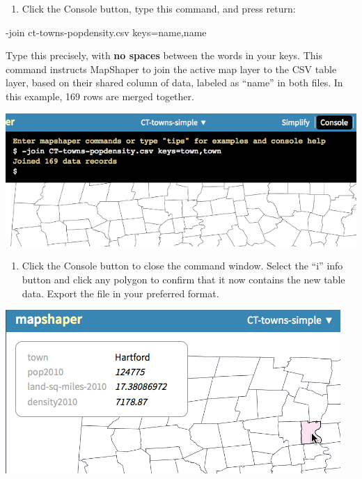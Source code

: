 \documentclass[
  english,
]{book}
\newenvironment{Shaded}{\begin{snugshade}}{\end{snugshade}}
\newcommand{\NormalTok}[1]{#1}
\providecommand{\tightlist}{%
  \setlength{\itemsep}{0pt}\setlength{\parskip}{0pt}}
\begin{document}
\begin{enumerate}
\def\labelenumi{\arabic{enumi}.}
\setcounter{enumi}{4}
\tightlist
\item
  Click the Console button, type this command, and press return:
\end{enumerate}

\begin{Shaded}
\begin{Highlighting}[]
\NormalTok{{-}join ct{-}towns{-}popdensity.csv keys=name,name}
\end{Highlighting}
\end{Shaded}

Type this precisely, with \textbf{no spaces} between the words in your keys. This command instructs MapShaper to join the active map layer to the CSV table layer, based on their shared column of data, labeled as ``name'' in both files. In this example, 169 rows are merged together.

\includegraphics{images/09-transform/mapshaper-join-console.png}

\begin{enumerate}
\def\labelenumi{\arabic{enumi}.}
\setcounter{enumi}{5}
\tightlist
\item
  Click the Console button to close the command window. Select the ``i'' info button and click any polygon to confirm that it now contains the new table data. Export the file in your preferred format.
\end{enumerate}

\includegraphics{images/09-transform/mapshaper-join-confirm.png}
\end{document}
